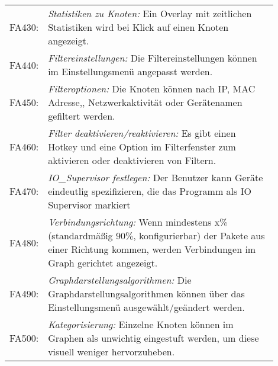 \begin{tabular}{lp{0.9\linewidth}}

FA430: & \textit{Statistiken zu Knoten: }Ein Overlay mit zeitlichen Statistiken wird bei Klick auf einen Knoten angezeigt. \\

FA440: & \textit{Filtereinstellungen: }Die Filtereinstellungen können im Einstellungsmenü angepasst werden. \\

FA450: & \textit{Filteroptionen: }Die Knoten können nach IP, MAC Adresse,, Netzwerkaktivität oder Gerätenamen gefiltert werden. \\

FA460: & \textit{Filter deaktivieren/reaktivieren: }Es gibt einen Hotkey und eine Option im Filterfenster zum aktivieren oder deaktivieren von Filtern. \\

FA470: & \textit{IO\_Supervisor festlegen: }Der Benutzer kann Geräte eindeutlig spezifizieren, die das Programm als IO Supervisor markiert \\ %

FA480: & \textit{Verbindungsrichtung: }Wenn mindestens x\% (standardmäßig 90\%, konfigurierbar) der Pakete aus einer Richtung kommen, werden Verbindungen im Graph gerichtet angezeigt. \\

FA490: & \textit{Graphdarstellungsalgorithmen: }Die Graphdarstellungsalgorithmen können über das Einstellungsmenü ausgewählt/geändert werden. \\

FA500: & \textit{Kategorisierung: }Einzelne Knoten können im Graphen als unwichtig eingestuft werden, um diese visuell weniger hervorzuheben. \\
\end{tabular} 